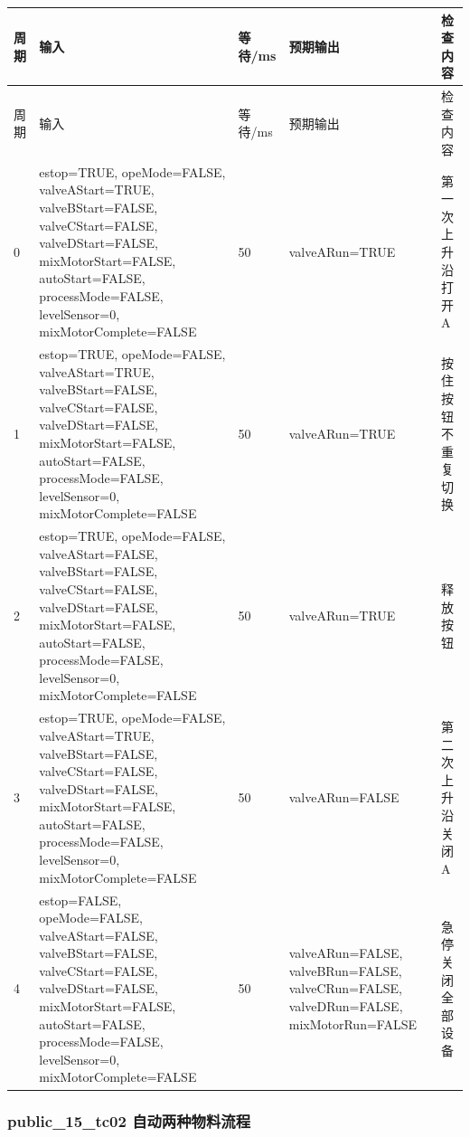 \begin{longtable}{L{1.0cm}L{4.7cm}L{1.4cm}L{4.0cm}L{2.1cm}}

\toprule

周期 & 输入 & 等待/ms & 预期输出 & 检查内容\\

\midrule

\endfirsthead

\toprule

周期 & 输入 & 等待/ms & 预期输出 & 检查内容\\

\midrule

\endhead

0 & estop=TRUE, opeMode=FALSE, valveAStart=TRUE, valveBStart=FALSE, valveCStart=FALSE, valveDStart=FALSE, mixMotorStart=FALSE, autoStart=FALSE, processMode=FALSE, levelSensor=0, mixMotorComplete=FALSE & 50 & valveARun=TRUE & 第一次上升沿打开 A\\

1 & estop=TRUE, opeMode=FALSE, valveAStart=TRUE, valveBStart=FALSE, valveCStart=FALSE, valveDStart=FALSE, mixMotorStart=FALSE, autoStart=FALSE, processMode=FALSE, levelSensor=0, mixMotorComplete=FALSE & 50 & valveARun=TRUE & 按住按钮不重复切换\\

2 & estop=TRUE, opeMode=FALSE, valveAStart=FALSE, valveBStart=FALSE, valveCStart=FALSE, valveDStart=FALSE, mixMotorStart=FALSE, autoStart=FALSE, processMode=FALSE, levelSensor=0, mixMotorComplete=FALSE & 50 & valveARun=TRUE & 释放按钮\\

3 & estop=TRUE, opeMode=FALSE, valveAStart=TRUE, valveBStart=FALSE, valveCStart=FALSE, valveDStart=FALSE, mixMotorStart=FALSE, autoStart=FALSE, processMode=FALSE, levelSensor=0, mixMotorComplete=FALSE & 50 & valveARun=FALSE & 第二次上升沿关闭 A\\

4 & estop=FALSE, opeMode=FALSE, valveAStart=FALSE, valveBStart=FALSE, valveCStart=FALSE, valveDStart=FALSE, mixMotorStart=FALSE, autoStart=FALSE, processMode=FALSE, levelSensor=0, mixMotorComplete=FALSE & 50 & valveARun=FALSE, valveBRun=FALSE, valveCRun=FALSE, valveDRun=FALSE, mixMotorRun=FALSE & 急停关闭全部设备\\

\bottomrule

\end{longtable}

\subsubsection{{\ttfamily public\_15\_tc02} 自动两种物料流程}

